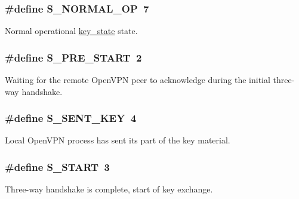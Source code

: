 \subsubsection[{S\+\_\+\+N\+O\+R\+M\+A\+L\+\_\+\+O\+P}]{\setlength{\rightskip}{0pt plus 5cm}\#define S\+\_\+\+N\+O\+R\+M\+A\+L\+\_\+\+O\+P~7}\label{group__control__processor_gaa92fb79464b68ac009946bd9cc9b8d89}
Normal operational {\ttfamily \hyperlink{structkey__state}{key\+\_\+state}} state. \hypertarget{group__control__processor_ga6be8de96f4d931c3be923f74f8511b02}{}
\subsubsection[{S\+\_\+\+P\+R\+E\+\_\+\+S\+T\+A\+R\+T}]{\setlength{\rightskip}{0pt plus 5cm}\#define S\+\_\+\+P\+R\+E\+\_\+\+S\+T\+A\+R\+T~2}\label{group__control__processor_ga6be8de96f4d931c3be923f74f8511b02}
Waiting for the remote Open\+V\+P\+N peer to acknowledge during the initial three-\/way handshake. \hypertarget{group__control__processor_gadf3421bc4c6c95c3ed9824fe7c2c20d8}{}
\subsubsection[{S\+\_\+\+S\+E\+N\+T\+\_\+\+K\+E\+Y}]{\setlength{\rightskip}{0pt plus 5cm}\#define S\+\_\+\+S\+E\+N\+T\+\_\+\+K\+E\+Y~4}\label{group__control__processor_gadf3421bc4c6c95c3ed9824fe7c2c20d8}
Local Open\+V\+P\+N process has sent its part of the key material. \hypertarget{group__control__processor_ga66275a3888e8a86da79d69078c27c18d}{}
\subsubsection[{S\+\_\+\+S\+T\+A\+R\+T}]{\setlength{\rightskip}{0pt plus 5cm}\#define S\+\_\+\+S\+T\+A\+R\+T~3}\label{group__control__processor_ga66275a3888e8a86da79d69078c27c18d}
Three-\/way handshake is complete, start of key exchange. \hypertarget{group__control__processor_ga5c620f0ab83a389abc17d80bfb1e0665}{}
